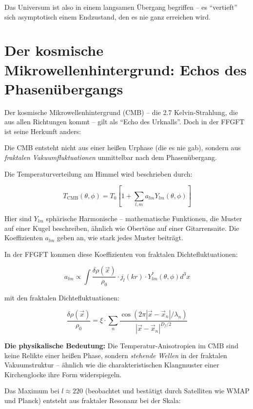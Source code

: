 \documentclass[12pt,a4paper]{article}
\begin{document}
Das Universum ist also in einem langsamen Übergang begriffen -- es ``vertieft'' sich asymptotisch einem Endzustand, den es nie ganz erreichen wird.

\section{Der kosmische Mikrowellenhintergrund: Echos des Phasenübergangs}

Der kosmische Mikrowellenhintergrund (CMB) -- die 2.7 Kelvin-Strahlung, die aus allen Richtungen kommt -- gilt als ``Echo des Urknalls''. Doch in der FFGFT ist seine Herkunft anders:

Die CMB entsteht nicht aus einer heißen Urphase (die es nie gab), sondern aus \textit{fraktalen Vakuumfluktuationen} unmittelbar nach dem Phasenübergang.

Die Temperaturverteilung am Himmel wird beschrieben durch:

\begin{equation}
T_{\text{CMB}}(\theta, \phi) = T_0 \left[1 + \sum_{l,m} a_{lm} Y_{lm}(\theta, \phi)\right]
\end{equation}

Hier sind $Y_{lm}$ sphärische Harmonische -- mathematische Funktionen, die Muster auf einer Kugel beschreiben, ähnlich wie Obertöne auf einer Gitarrensaite. Die Koeffizienten $a_{lm}$ geben an, wie stark jedes Muster beiträgt.

In der FFGFT kommen diese Koeffizienten von fraktalen Dichtefluktuationen:

\begin{equation}
a_{lm} \propto \int \frac{\delta \rho(\vec{x})}{\rho_0} \cdot j_l(kr) \cdot Y_{lm}^*(\theta, \phi) d^3x
\end{equation}

mit den fraktalen Dichtefluktuationen:

\begin{equation}
\frac{\delta \rho(\vec{x})}{\rho_0} = \xi \cdot \sum_n \frac{\cos(2\pi |\vec{x} - \vec{x}_n|/\lambda_n)}{|\vec{x} - \vec{x}_n|^{D_f/2}}
\end{equation}

\textbf{Die physikalische Bedeutung:} Die Temperatur-Anisotropien im CMB sind keine Relikte einer heißen Phase, sondern \textit{stehende Wellen} in der fraktalen Vakuumstruktur -- ähnlich wie die charakteristischen Klangmuster einer Kirchenglocke ihre Form widerspiegeln.

Das Maximum bei $l \approx 220$ (beobachtet und bestätigt durch Satelliten wie WMAP und Planck) entsteht aus fraktaler Resonanz bei der Skala:
\end{document}
